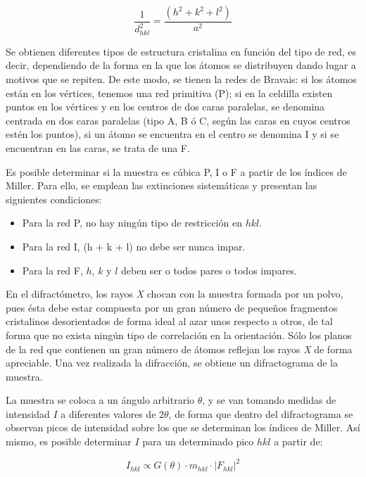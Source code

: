 \documentclass[a4paper,twocolumn,10pt]{article}
\begin{document}
\begin{equation}
\frac{1}{d_{hkl}^2} = \frac{(h^2 + k^2 + l^2)}{a^2}
\end{equation}


Se obtienen diferentes tipos de estructura cristalina en función del tipo de red, es decir, dependiendo de la forma en la que los átomos se distribuyen dando lugar a motivos que se repiten. De este modo, se tienen la redes de Bravais: si los átomos están en los vértices, tenemos una red primitiva (P);
si en la celdilla existen puntos en los vértices y en los centros de dos caras paralelas, se denomina centrada en dos caras paralelas (tipo A, B ó C, según las caras en cuyos centros estén los puntos), si un átomo se encuentra en el centro se denomina  I y si se encuentran en las caras, se trata de una  F. 

Es posible determinar si la muestra es cúbica P, I o F a partir de los índices de Miller. Para ello, se emplean las extinciones sistemáticas y presentan las siguientes condiciones:

\begin{itemize}
\item Para la red P, no hay ningún tipo de restricción en $hkl$.
\item Para la red I, (h + k + l) no debe ser nunca impar.
\item Para la red F, $h$, $k$ y $l$ deben ser o todos pares o todos impares.
\end{itemize}


En el difractómetro, los rayos \textit{X} chocan con la muestra formada por un  polvo, pues ésta debe estar compuesta por un gran número de pequeños fragmentos cristalinos desorientados de forma ideal al azar unos respecto a otros, de tal forma que no exista ningún tipo de correlación en la orientación. Sólo los planos de la red que contienen un gran número de átomos reflejan los rayos \textit{X} de forma apreciable. Una vez realizada la difracción, se obtiene un difractograma de la muestra.

La muestra se coloca a un ángulo arbitrario $\theta$, y se van tomando medidas de intensidad $I$ a diferentes valores de $2\theta$, de forma que dentro del difractograma se observan picos de intensidad sobre los que se determinan los índices de Miller. Así mismo, es posible determinar $I$ para un determinado pico $hkl$ a partir de:

\begin{equation}
I_{hkl} \propto G(\theta) \cdot m_{hkl} \cdot |F_{hkl}|^2
\end{equation}
\end{document}
